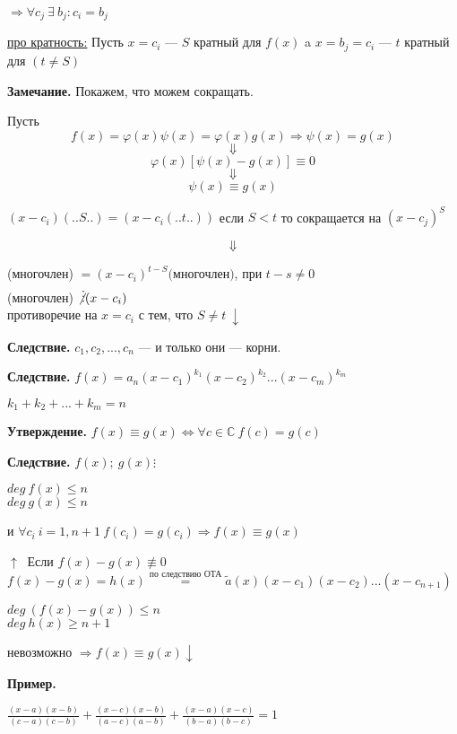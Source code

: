 \documentclass{article}
\begin{document}
    \( \Rightarrow \forall c_j\ \exists\ b_j: c_i = b_j\)

    \underline{про кратность:} Пусть \(x = c_i\) --- \(S\) кратный для \(f(x)\) a \(x = b_j = c_i\) --- \(t\) кратный для \( (t \not = S)\) 
    
    \textbf{Замечание.} Покажем, что можем сокращать.

    Пусть \[f(x) = \varphi(x)\psi(x) = \varphi(x)g(x) \Rightarrow \psi(x) = g(x)\]
    \[\Downarrow\]
    \[ \varphi(x)[\psi(x) - g(x)] \equiv 0 \]
    \[\Downarrow\]
    \[\psi(x) \equiv g(x)\]
    
    \( (x - c_i)(..S..) = (x - c_i(..t..))\)
    если \(S < t\) то сокращается на \((x-c_j)^S\)

    \[\Downarrow\]

    (многочлен) \( = (x - c_i)^{t - S}(\)многочлен\()\), при \(t - s \neq 0\)\\
    (многочлен) \(\not \vdots (x-c_i)\)\\
    противоречие на \(x = c_i\) с тем, что \(S \neq t\ \downarrow\)

    
    \textbf{Следствие.} \(c_1, c_2,..., c_n\) --- и только они --- корни.
    
    \textbf{Следствие.} \(f(x) = a_n(x-c_1)^{k_1}(x-c_2)^{k_2}...(x-c_m)^{k_m}\)
    
    \(k_1 + k_2 + ... + k_m = n\)
    
    \textbf{Утверждение.} \(f(x) \equiv g(x) \Leftrightarrow \forall c \in \mathbb{C}\ f(c) = g(c)\)
    
    \textbf{Следствие.} \(f(x);\ g(x) \vdots\)
    
    \(deg\ f(x) \leq n\)\\
    \(deg\ g(x) \leq n\)
    
    и \( \forall c_i \ i=1, n+1\ f(c_i) = g(c_i) \Rightarrow f(x) \equiv g(x) \)
    
    
    \(\uparrow\ \) Если \(f(x) - g(x) \not \equiv 0\)
    \(f(x) - g(x) = h(x) \overset{\textrm{по следствию ОТА}}= \tilde{a}(x) (x-c_1)(x-c_2)...(x-c_{n+1})\)
    
    \(deg\ (f(x)-g(x)) \leq n\)\\
    \(deg\ h(x) \geq n+1\)

    невозможно \(\Rightarrow f(x) \equiv g(x)\downarrow\)
    
    \textbf{Пример.}

    \(\frac{(x-a)(x-b)}{(c-a)(c-b)}+\frac{(x-c)(x-b)}{(a-c)(a-b)} + \frac{(x-a)(x-c)}{(b-a)(b-c)} = 1\)
    
\end{document}
